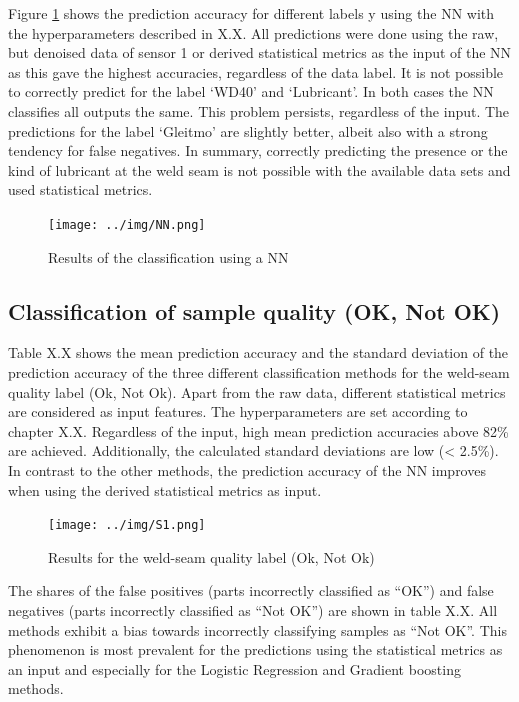 \documentclass[12pt]{report}
\begin{document}
Figure \ref{fig:NN} shows the prediction accuracy for different labels y using the NN with the hyperparameters described in X.X. All predictions were done using the raw, but denoised data of sensor 1 or derived statistical metrics as the input of the NN as this gave the highest accuracies, regardless of the data label.
It is not possible to correctly predict for the label ‘WD40’ and ‘Lubricant’. In both cases the NN classifies all outputs the same. This problem persists, regardless of the input.
The predictions for the label ‘Gleitmo’ are slightly better, albeit also with a strong tendency for false negatives. 
In summary, correctly predicting the presence or the kind of lubricant at the weld seam is not possible with the available data sets and used statistical metrics.

\begin{figure}[H]
	\centering
	\texttt{[image: ../img/NN.png]}
	\caption{Results of the classification using a NN}
	\label{fig:NN}
\end{figure}

\subsection{Classification of sample quality (OK, Not OK) }
Table X.X shows the mean prediction accuracy and the standard deviation of the prediction accuracy of the three different classification methods for the weld-seam quality label (Ok, Not Ok). Apart from the raw data, different statistical metrics are considered as input features. The hyperparameters are set according to chapter X.X.
Regardless of the input, high mean prediction accuracies above 82\% are achieved. Additionally, the calculated standard deviations are low (< 2.5\%). In contrast to the other methods, the prediction accuracy of the NN improves when using the derived statistical metrics as input. 


\begin{figure}[H]
	\centering
	\texttt{[image: ../img/S1.png]}
	\caption{Results for the weld-seam quality label (Ok, Not Ok)}
	\label{fig:S1}
\end{figure}

The shares of the false positives (parts incorrectly classified as “OK”) and false negatives (parts incorrectly classified as “Not OK”) are shown in table X.X. All methods exhibit a bias towards incorrectly classifying samples as “Not OK”. This phenomenon is most prevalent for the predictions using the statistical metrics as an input and especially for the Logistic Regression and Gradient boosting methods.
\end{document}
